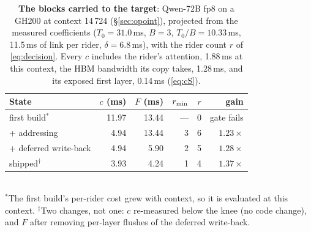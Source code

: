 \begin{table}[t]
\centering\small
\caption{\textbf{The blocks carried to the target}: Qwen-72B fp8 on a GH200 at
context 14\,724 (\S\ref{sec:opoint}), projected from the measured
coefficients ($T_0 = 31.0$\,ms, $B = 3$, $T_0/B = 10.33$\,ms, 11.5\,ms of
link per rider, $\delta = 6.8$\,ms), with the rider count $r$ of
\cref{eq:decision}. Every $c$ includes the rider's attention,
1.88\,ms at this context, the HBM bandwidth its copy takes, 1.28\,ms, and its
exposed first layer, 0.14\,ms (\cref{eq:cS}).}
\label{tab:ladder}
\setlength{\tabcolsep}{4pt}
\begin{tabular}{@{}l r r r r r@{}}
\toprule
State & $c$ (ms) & $F$ (ms) & $r_{\min}$ & $r$ & gain \\
\midrule
first build$^{*}$        & 11.97 & 13.44 & --- & 0 & gate fails \\
+ addressing             & 4.94 & 13.44 & 3 & 6 & $1.23\times$ \\
+ deferred write-back    & 4.94 &  5.90 & 2 & 5 & $1.28\times$ \\
shipped$^{\dagger}$      & 3.93 &  4.24 & 1 & 4 & $1.37\times$ \\
\bottomrule
\end{tabular}
\\[2pt]
{\footnotesize $^{*}$The first build's per-rider cost grew with context, so it
is evaluated at this context. $^{\dagger}$Two changes, not one: $c$ re-measured
below the knee (no code change), and $F$ after removing per-layer flushes of the
deferred write-back.}
\end{table}

